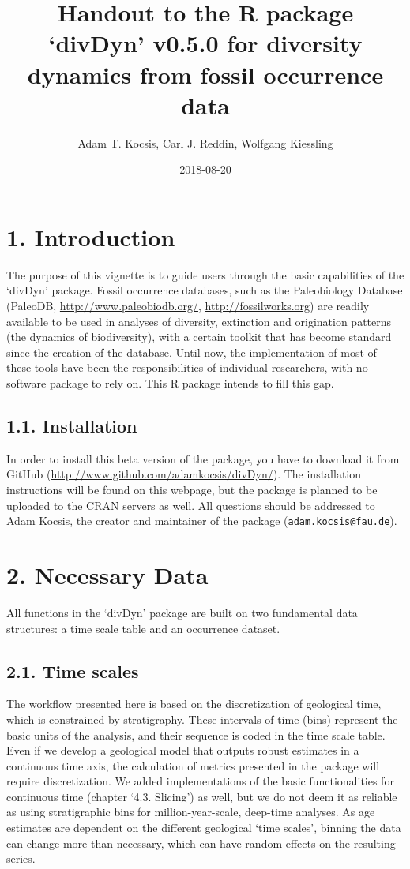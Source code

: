 \documentclass[]{article}
\title{Handout to the R package `divDyn' v0.5.0 for diversity dynamics from
fossil occurrence data}
\author{Adam T. Kocsis, Carl J. Reddin, Wolfgang Kiessling}
\date{2018-08-20}
\begin{document}
\maketitle

\section{1. Introduction}\label{introduction}

The purpose of this vignette is to guide users through the basic
capabilities of the `divDyn' package. Fossil occurrence databases, such
as the Paleobiology Database (PaleoDB, \url{http://www.paleobiodb.org/},
\url{http://fossilworks.org}) are readily available to be used in
analyses of diversity, extinction and origination patterns (the dynamics
of biodiversity), with a certain toolkit that has become standard since
the creation of the database. Until now, the implementation of most of
these tools have been the responsibilities of individual researchers,
with no software package to rely on. This R package intends to fill this
gap.

\subsection{1.1. Installation}\label{installation}

In order to install this beta version of the package, you have to
download it from GitHub
(\url{http://www.github.com/adamkocsis/divDyn/}). The installation
instructions will be found on this webpage, but the package is planned
to be uploaded to the CRAN servers as well. All questions should be
addressed to Adam Kocsis, the creator and maintainer of the package
(\href{mailto:adam.kocsis@fau.de}{\nolinkurl{adam.kocsis@fau.de}}).

\section{2. Necessary Data}\label{necessary-data}

All functions in the `divDyn' package are built on two fundamental data
structures: a time scale table and an occurrence dataset.

\subsection{2.1. Time scales}\label{time-scales}

The workflow presented here is based on the discretization of geological
time, which is constrained by stratigraphy. These intervals of time
(bins) represent the basic units of the analysis, and their sequence is
coded in the time scale table. Even if we develop a geological model
that outputs robust estimates in a continuous time axis, the calculation
of metrics presented in the package will require discretization. We
added implementations of the basic functionalities for continuous time
(chapter `4.3. Slicing') as well, but we do not deem it as reliable as
using stratigraphic bins for million-year-scale, deep-time analyses. As
age estimates are dependent on the different geological `time scales',
binning the data can change more than necessary, which can have random
effects on the resulting series.
\end{document}
